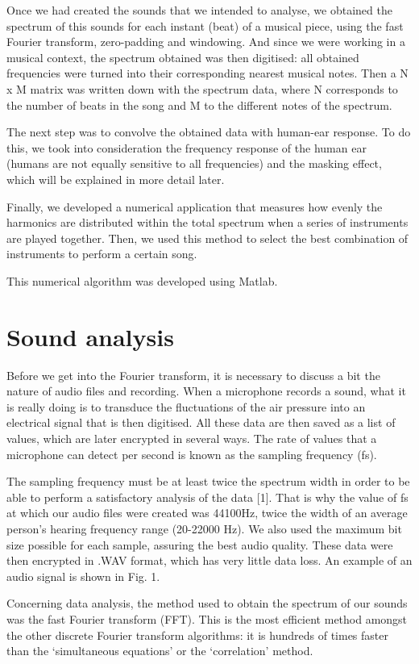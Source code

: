 \documentclass[twocolumn]{revtex4}
\begin{document}
Once we had created the sounds that we intended to analyse, we obtained the spectrum of this sounds for each instant (beat) of a musical piece, using the fast Fourier transform, zero-padding and windowing. And since we were working in a musical context, the spectrum obtained was then digitised: all obtained frequencies were turned into their corresponding nearest musical notes.  
Then a N x M matrix was written down with the spectrum data, where N corresponds to the number of beats in the song and M to the different notes of the spectrum.

The next step was to convolve the obtained data with human-ear response. To do this, we took into consideration the frequency response of the human ear (humans are not equally sensitive to all frequencies) and the masking effect, which will be explained in more detail later.

Finally, we developed a numerical application that measures how evenly the harmonics are distributed within the total spectrum when a series of instruments are played together. Then, we used this method to select the best combination of instruments to perform a certain song.

This numerical algorithm was developed using Matlab.

\section{Sound analysis}
Before we get into the Fourier transform, it is necessary to discuss a bit the nature of audio files and recording.
When a microphone records a sound, what it is really doing is to transduce the fluctuations of the air pressure into an electrical signal that is then digitised. All these data are then saved as a list of values, which are later encrypted in several ways. The rate of values that a microphone can detect per second is known as the sampling frequency (fs).

The sampling frequency must be at least twice the spectrum width in order to be able to perform a satisfactory analysis of the data [1]. That is why the value of fs at which our audio files were created was 44100Hz, twice the width of an average person's hearing frequency range (20-22000 Hz). We also used the maximum bit size possible for each sample, assuring the best audio quality. These data were then encrypted in .WAV format, which has very little data loss.
An example of an audio signal is shown in Fig. 1.

Concerning data analysis, the method used to obtain the spectrum of our sounds was the fast Fourier transform (FFT). This is the most efficient method amongst the other discrete Fourier transform algorithms: it is hundreds of times faster than the `simultaneous equations' or the `correlation' method. 
\end{document}
